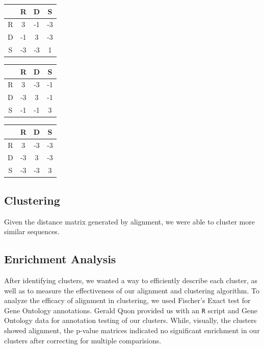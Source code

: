\documentclass[aps,prd,final,onecolumn,a4paper,10pt]{revtex4}
\begin{document}
\begin{center}
\begin{tabular}{c | ccc}
  & R & D & S\\ \hline

  R &  3 & -1 & -3\\
  D & -1 & 3 & -3\\
  S & -3 & -3 & 1\\
\end{tabular}
\quad
\begin{tabular}{c | ccc}
  & R & D & S\\ \hline

  R &  3 & -3 & -1\\
  D & -3 & 3 & -1\\
  S & -1 & -1 & 3\\
\end{tabular}
\quad
\begin{tabular}{c | ccc}
  & R & D & S\\ \hline

  R &  3 & -3 & -3\\
  D & -3 & 3 & -3\\
  S & -3 & -3 & 3\\
\end{tabular}
\end{center}

\subsection{Clustering}

Given the distance matrix generated by alignment, we were able to cluster more similar sequences.



\subsection{Enrichment Analysis}
After identifying clusters, we wanted a way to efficiently describe each cluster, as well as to measure the effectiveness of our alignment and clustering algorithm.
To analyze the efficacy of alignment in clustering, we used Fischer's Exact test for Gene Ontology annotations.
Gerald Quon provided us with an \verb!R! script and Gene Ontology data for annotation testing of our clusters.
While, visually, the clusters showed alignment, the p-value matrices indicated no significant enrichment in our clusters after correcting for multiple comparisions.\\
\end{document}
